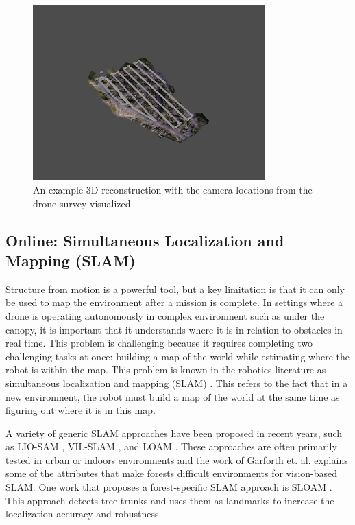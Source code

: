 \begin{figure}
    \centering
    \includegraphics[width=0.8\textwidth, trim={4cm 3cm 4cm 4cm}, clip]{figs/methods/structure_from_motion/camera estimation.png}
    \caption{An example 3D reconstruction with the camera locations from the drone survey visualized.}
    \label{fig:background:camera_locations}
\end{figure}


\subsection{Online: Simultaneous Localization and Mapping (SLAM)}
Structure from motion is a powerful tool, but a key limitation is that it can only be used to map the environment after a mission is complete. In settings where a drone is operating autonomously in complex environment such as under the canopy, it is important that it understands where it is in relation to obstacles in real time. This problem is challenging because it requires completing two challenging tasks at once: building a map of the world while estimating where the robot is within the map. This problem is known in the robotics literature as simultaneous localization and mapping (SLAM) \cite{durrant2006simultaneous}. This refers to the fact that in a new environment, the robot must build a map of the world at the same time as figuring out where it is in this map. 

A variety of generic SLAM approaches have been proposed in recent years, such as LIO-SAM \cite{}, VIL-SLAM \cite{}, and LOAM \cite{}. These approaches are often primarily tested in urban or indoors environments and the work of Garforth et. al. \cite{Garforth2019VisualSLAM} explains some of the attributes that make forests difficult environments for vision-based SLAM. One work that proposes a forest-specific SLAM approach is SLOAM \cite{Chen2020SLOAM:Inventory}. This approach detects tree trunks and uses them as landmarks to increase the localization accuracy and robustness.


